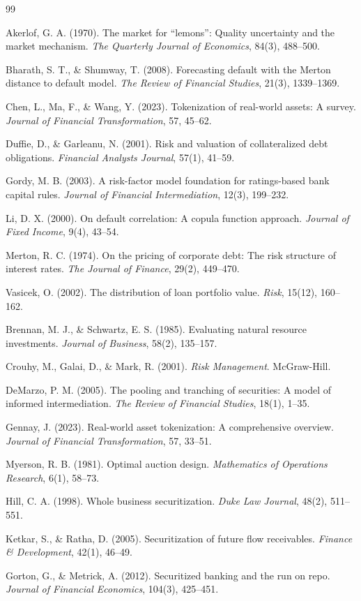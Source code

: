 \documentclass[12pt,a4paper]{article}
\begin{document}

\begin{thebibliography}{99}

Akerlof, G. A. (1970).
The market for ``lemons'': Quality uncertainty and the market mechanism.
\emph{The Quarterly Journal of Economics}, 84(3), 488--500.

Bharath, S. T., \& Shumway, T. (2008).
Forecasting default with the Merton distance to default model.
\emph{The Review of Financial Studies}, 21(3), 1339--1369.

Chen, L., Ma, F., \& Wang, Y. (2023).
Tokenization of real-world assets: A survey.
\emph{Journal of Financial Transformation}, 57, 45--62.

Duffie, D., \& Garleanu, N. (2001).
Risk and valuation of collateralized debt obligations.
\emph{Financial Analysts Journal}, 57(1), 41--59.

Gordy, M. B. (2003).
A risk-factor model foundation for ratings-based bank capital rules.
\emph{Journal of Financial Intermediation}, 12(3), 199--232.

Li, D. X. (2000).
On default correlation: A copula function approach.
\emph{Journal of Fixed Income}, 9(4), 43--54.

Merton, R. C. (1974).
On the pricing of corporate debt: The risk structure of interest rates.
\emph{The Journal of Finance}, 29(2), 449--470.

Vasicek, O. (2002).
The distribution of loan portfolio value.
\emph{Risk}, 15(12), 160--162.

Brennan, M. J., \& Schwartz, E. S. (1985).
Evaluating natural resource investments.
\emph{Journal of Business}, 58(2), 135--157.

Crouhy, M., Galai, D., \& Mark, R. (2001).
\emph{Risk Management}.
McGraw-Hill.

DeMarzo, P. M. (2005).
The pooling and tranching of securities: A model of informed intermediation.
\emph{The Review of Financial Studies}, 18(1), 1--35.

Gennay, J. (2023).
Real-world asset tokenization: A comprehensive overview.
\emph{Journal of Financial Transformation}, 57, 33--51.

Myerson, R. B. (1981).
Optimal auction design.
\emph{Mathematics of Operations Research}, 6(1), 58--73.

Hill, C. A. (1998).
Whole business securitization.
\emph{Duke Law Journal}, 48(2), 511--551.

Ketkar, S., \& Ratha, D. (2005).
Securitization of future flow receivables.
\emph{Finance \& Development}, 42(1), 46--49.

Gorton, G., \& Metrick, A. (2012).
Securitized banking and the run on repo.
\emph{Journal of Financial Economics}, 104(3), 425--451.

\end{thebibliography}
\end{document}

